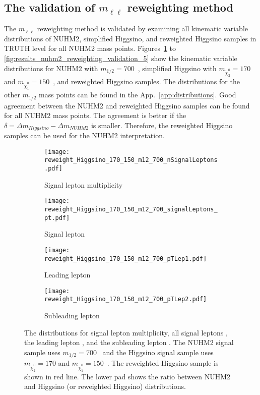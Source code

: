\subsection{The validation of $m_{\ell \ell}$ reweighting method}
\label{subsec:results_reweighted_validations}
The $m_{\ell \ell}$ reweighting method is validated by examining all kinematic variable distributions of NUHM2, simplified Higgsino, and reweighted Higgsino samples in TRUTH level for all NUHM2 mass points.
Figures~\ref{fig:results_nuhm2_reweighting_validation_1} to \ref{fig:results_nuhm2_reweighting_validation_5} show the kinematic variable distributions for NUHM2 with $m_{1/2} = 700$~{\GeV}, simplified Higgsino with $m_{\widetilde{\chi}^{0}_{2}} = 170$ and $m_{\widetilde{\chi}^{0}_{1}} = 150$~{\GeV}, and reweighted Higgsino samples.
The distributions for the other $m_{1/2}$ mass points can be found in the App.~\ref{app:distributions}.
Good agreement between the NUHM2 and reweighted Higgsino samples can be found for all NUHM2 mass points.
The agreement is better if the $\delta = \Delta m_{Higgsino} - \Delta m_{NUHM2}$ is smaller.
Therefore, the reweighted Higgsino samples can be used for the NUHM2 interpretation.

\begin{figure}[htbp]
    \begin{center}
        \begin{subfigure}[b]{0.48\textwidth}
            \texttt{[image: reweight\_Higgsino\_170\_150\_m12\_700\_nSignalLeptons.pdf]}
            \caption{Signal lepton multiplicity}
        \end{subfigure}
        \begin{subfigure}[b]{0.48\textwidth}
            \texttt{[image: reweight\_Higgsino\_170\_150\_m12\_700\_signalLeptons\_pt.pdf]}
            \caption{Signal lepton \pt}
        \end{subfigure}
        \begin{subfigure}[b]{0.48\textwidth}
            \texttt{[image: reweight\_Higgsino\_170\_150\_m12\_700\_pTLep1.pdf]}
            \caption{Leading lepton \pt}
        \end{subfigure}
        \begin{subfigure}[b]{0.48\textwidth}
            \texttt{[image: reweight\_Higgsino\_170\_150\_m12\_700\_pTLep2.pdf]}
            \caption{Subleading lepton \pt}
        \end{subfigure}
    \end{center}
    \caption{The distributions for signal lepton multiplicity, all signal leptons \pt, the leading lepton \pt, and the subleading lepton \pt.
    The NUHM2 signal sample uses  $m_{1/2} = 700$~{\GeV} and the Higgsino signal sample uses $m_{\widetilde{\chi}^{0}_{2}} = 170$ and $m_{\widetilde{\chi}^{0}_{1}} = 150$~{\GeV}.
    The reweighted Higgsino sample is shown in red line.
    The lower pad shows the ratio between NUHM2 and Higgsino (or reweighted Higgsino) distributions.}
    \label{fig:results_nuhm2_reweighting_validation_1}
\end{figure}

